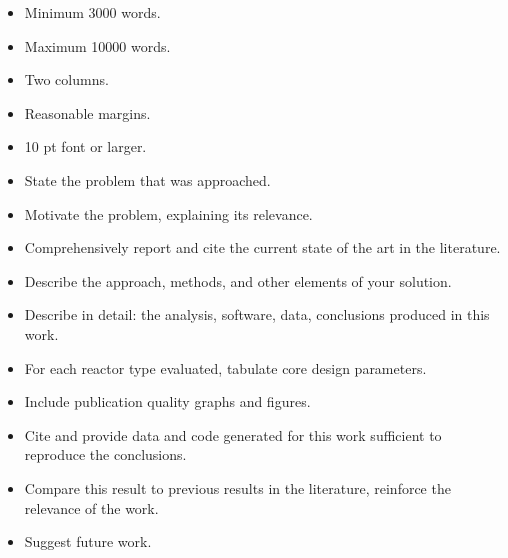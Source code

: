\documentclass[12pts, answers]{exam}
\begin{document}
\begin{questions}
\begin{itemize}
\item Minimum 3000 words.
\item Maximum 10000 words.
\item Two columns.
\item Reasonable margins.
\item 10 pt font or larger.
\item State the problem that was approached.
\item Motivate the problem, explaining its relevance.
\item Comprehensively report and cite the current state of the art in the literature.
\item Describe the approach, methods, and other elements of your solution.
\item Describe in detail: the analysis, software, data, conclusions produced in this work.
\item For each reactor type evaluated, tabulate core design parameters.
\item Include publication quality graphs and figures.
\item Cite and provide data and code generated for this work sufficient to reproduce the conclusions.
\item Compare this result to previous results in the literature, reinforce the relevance of the work. 
\item Suggest future work.
\end{itemize}

\end{questions}


%
%
\end{document}
